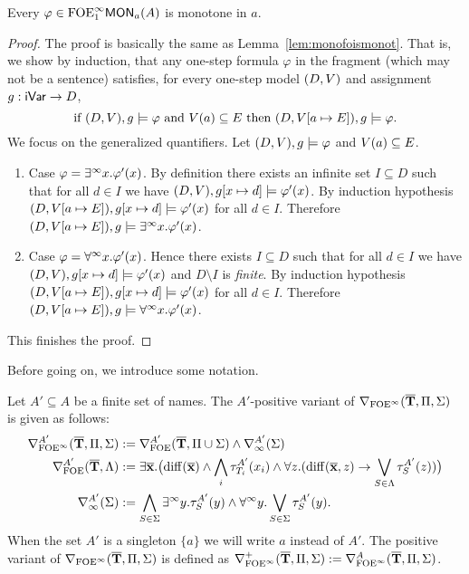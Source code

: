 \begin{lemma}\label{lem:monofoeiismonot}
Every $\varphi \in \monot{\ofoei}{a}(A)$ is monotone in $a$.
\end{lemma}
\begin{proof}
The proof is basically the same as Lemma~\ref{lem:monofoismonot}.
That is, we show by induction, that any one-step formula $\varphi$ in the fragment (which may not be a sentence) satisfies, for every one-step model $(D,\val)$ and assignment ${\ass:\fovar\to D}$, 
%
\[
\text{if } (D,\val),\ass \models \varphi \text{ and } \val(a) \subseteq E \text{ then } (D,\val[a\mapsto E]),\ass \models \varphi.
\] 
%
We focus on the generalized quantifiers. Let $(D,\val),\ass \models \varphi$ and $\val(a) \subseteq E$.
%
\begin{enumerate}[\textbullet]
\item Case $\varphi = \qu x.\varphi'(x)$. By definition there exists an infinite set $I\subseteq D$ such that for all $d\in I$ we have $(D,\val),\ass[x\mapsto d] \models \varphi'(x)$. By induction hypothesis $(D,\val[a\mapsto E]),\ass[x\mapsto d] \models \varphi'(x)$ for all $d \in I$. Therefore $(D,\val[a\mapsto E]),\ass \models \qu x.\varphi'(x)$.

\item Case $\varphi = \dqu x.\varphi'(x)$. Hence there exists $I\subseteq D$ such that for all $d\in I$ we have $(D,\val),\ass[x\mapsto d] \models \varphi'(x)$ and $D\setminus I$ is \emph{finite}. By induction hypothesis $(D,\val[a\mapsto E]),\ass[x\mapsto d] \models \varphi'(x)$ for all $d \in I$. Therefore $(D,\val[a\mapsto E]),\ass \models \dqu x.\varphi'(x)$.
\end{enumerate}
%
This finishes the proof.
\end{proof}

\noindent Before going on, we introduce some notation.

\begin{definition}
Let $A'\subseteq A$ be a finite set of names. The $A'$-positive variant of $\dbnfofoei{\vlist{T}}{\Pi}{\Sigma}$ is given as follows:
\begin{align*}
	\mondbnfofoei{\vlist{T}}{\Pi}{\Sigma}{A'} &:= \mondbnfofoe{\vlist{T}}{\Pi \cup \Sigma}{A'} \land \mondbnfinf{\Sigma}{A'}\\
	\mondbnfofoe{\vlist{T}}{\Lambda}{A'} &:= \exists \vlist{x}.\big(\arediff{\vlist{x}} \land \bigwedge_i \tau^{A'}_{T_i}(x_i) \land \forall z.(\arediff{\vlist{x},z} \lthen \bigvee_{S\in \Lambda} \tau^{A'}_S(z))\big) \\
	\mondbnfinf{\Sigma}{A'} &:= \bigwedge_{S\in\Sigma} \qu y.\tau^{A'}_S(y) \land \dqu y.\bigvee_{S\in\Sigma} \tau^{A'}_S(y) .
\end{align*}
When the set $A'$ is a singleton $\{a\}$ we will write $a$ instead of $A'$. The positive variant of $\dbnfofoei{\vlist{T}}{\Pi}{\Sigma}$ is defined as $\posdbnfofoei{\vlist{T}}{\Pi}{\Sigma} := \mondbnfofoei{\vlist{T}}{\Pi}{\Sigma}{A}$.
\end{definition}

